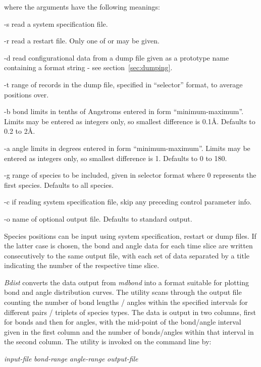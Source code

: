 \documentclass[a4paper,twoside]{report}
\begin{document}
where the arguments have the following meanings:
\begin{Argdescription}
\item[-s] read a system specification file.
\item[-r] read a restart file. Only one of  or  may be given.
\item[-d] read configurational data from a dump file given as a prototype name
  containing a  format string - see section~\ref{sec:dumping}. 
\item[-t] range of records in the dump file, specified in ``selector''
  format, to average positions over.
\item[-b] bond limits in tenths of Angstroms entered in form
  ``minimum-maximum''. Limits may be entered as integers only, so
  smallest difference is 0.1{\AA}. Defaults to 0.2 to 2{\AA}.
\item[-a] angle limits in degrees entered in form ``minimum-maximum''.
  Limits may be entered as integers only, so smallest difference is
  1{\textdegree}. Defaults to 0 to 180{\textdegree}.
\item[-g] range of species to be included, given in selector format
  where 0 represents the first species. Defaults to all species.
\item[-c] if reading system specification file, skip any preceding
  control parameter info.
\item[-o] name of optional output file. Defaults to standard output.
\end{Argdescription}


Species positions can be input using system specification, restart or dump
files. If the latter case is chosen, the bond and angle data for each time
slice are written consecutively to the same output file, with each set of
data separated by a title indicating the number of the respective time
slice.

\emph{Bdist} converts the data output from \emph{mdbond} into a format
suitable for
plotting bond and angle distribution curves. The utility scans through the
output file counting the number of bond lengths / angles within the
specified intervals for different pairs / triplets of species types. The
data is output in two columns, first for bonds and then for angles, with
the mid-point of the bond/angle interval given in the first column and the
number of bonds/angles within that interval in the second column. The
utility is invoked on the command line by:

\begin{center}
\Lit{[-i} \textit{input-file}\Lit{]}
\Lit{[-b} \textit{bond-range}\Lit{]}
\Lit{[-a} \textit{angle-range}\Lit{]}
\Lit{[-o} \textit{output-file}\Lit{]}
\end{center}
\end{document}
